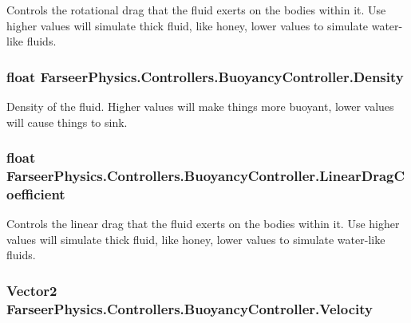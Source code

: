 Controls the rotational drag that the fluid exerts on the bodies within it. Use higher values will simulate thick fluid, like honey, lower values to simulate water-\/like fluids. 

\hypertarget{class_farseer_physics_1_1_controllers_1_1_buoyancy_controller_a57ba9c3aa147b770dd411f209ba92a6e}{
\subsubsection[{Density}]{\setlength{\rightskip}{0pt plus 5cm}float Farseer\+Physics.\+Controllers.\+Buoyancy\+Controller.\+Density}}\label{class_farseer_physics_1_1_controllers_1_1_buoyancy_controller_a57ba9c3aa147b770dd411f209ba92a6e}


Density of the fluid. Higher values will make things more buoyant, lower values will cause things to sink. 

\hypertarget{class_farseer_physics_1_1_controllers_1_1_buoyancy_controller_a2df8072945d7c6154e0bcc1c84052117}{
\subsubsection[{Linear\+Drag\+Coefficient}]{\setlength{\rightskip}{0pt plus 5cm}float Farseer\+Physics.\+Controllers.\+Buoyancy\+Controller.\+Linear\+Drag\+Coefficient}}\label{class_farseer_physics_1_1_controllers_1_1_buoyancy_controller_a2df8072945d7c6154e0bcc1c84052117}


Controls the linear drag that the fluid exerts on the bodies within it. Use higher values will simulate thick fluid, like honey, lower values to simulate water-\/like fluids. 

\hypertarget{class_farseer_physics_1_1_controllers_1_1_buoyancy_controller_ab04dfa65ec34fdd8f0c31aadd5423417}{
\subsubsection[{Velocity}]{\setlength{\rightskip}{0pt plus 5cm}Vector2 Farseer\+Physics.\+Controllers.\+Buoyancy\+Controller.\+Velocity}}\label{class_farseer_physics_1_1_controllers_1_1_buoyancy_controller_ab04dfa65ec34fdd8f0c31aadd5423417}


